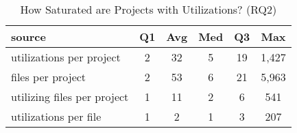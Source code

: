\begin{table}[tb]
\begin{center}
\begin{small}
\caption{How Saturated are Projects with Utilizations? (RQ2)}
\label{table:saturation}

\begin{tabular}{l|ccccc}
\toprule
source & Q1 & Avg & Med & Q3 & Max \\ 
 \hline \bigstrut
utilizations per project & 2 & 32 & 5 & 19 & 1,427 \\ 
 \hline \bigstrut
files per project & 2 & 53 & 6 & 21 & 5,963 \\ 
 \hline \bigstrut
utilizing files per project & 1 & 11 & 2 & 6 & 541 \\ 
 \hline \bigstrut
utilizations per file & 1 & 2 & 1 & 3 & 207 \\ 
\bottomrule
\end{tabular}
\end{small}
\end{center}
\end{table}
